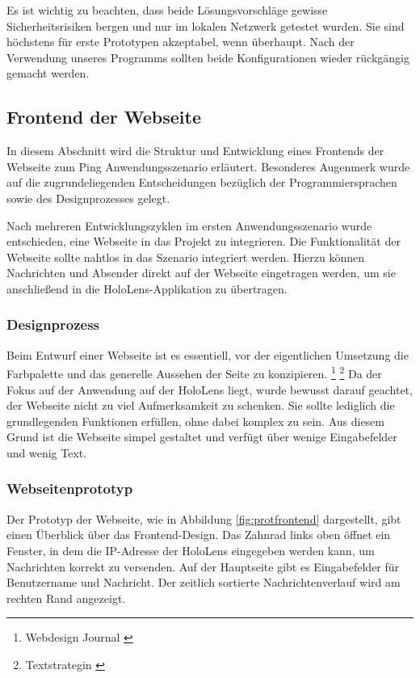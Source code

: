\begin{itemize}
Es ist wichtig zu beachten, dass beide Lösungsvorschläge gewisse Sicherheitsrisiken bergen und nur im lokalen Netzwerk getestet wurden. Sie sind höchstens für erste Prototypen akzeptabel, wenn überhaupt. Nach der Verwendung unseres Programms sollten beide Konfigurationen wieder rückgängig gemacht werden.

\subsection{\label{sec:FrontendWebseite}Frontend der Webseite}
In diesem Abschnitt wird die Struktur und Entwicklung eines Frontends der Webseite zum Ping Anwendungsszenario erläutert. Besonderes Augenmerk wurde auf die zugrundeliegenden Entscheidungen bezüglich der Programmiersprachen sowie des Designprozesses gelegt.

Nach mehreren Entwicklungszyklen im ersten Anwendungsszenario wurde entschieden, eine Webseite in das Projekt zu integrieren. Die Funktionalität der Webseite sollte nahtlos in das Szenario integriert werden. Hierzu können Nachrichten und Absender direkt auf der Webseite eingetragen werden, um sie anschließend in die HoloLens-Applikation zu übertragen.

\subsubsection{Designprozess}
Beim Entwurf einer Webseite ist es essentiell, vor der eigentlichen Umsetzung die Farbpalette und das generelle Aussehen der Seite zu konzipieren. \footnote{Webdesign Journal \cite{Website Konzept}} \footnote{Textstrategin \cite{Aufbau einer Website Inhalte und Struktur richtig Planen und Erstellen}} Da der Fokus auf der Anwendung auf der HoloLens liegt, wurde bewusst darauf geachtet, der Webseite nicht zu viel Aufmerksamkeit zu schenken. Sie sollte lediglich die grundlegenden Funktionen erfüllen, ohne dabei komplex zu sein. Aus diesem Grund ist die Webseite simpel gestaltet und verfügt über wenige Eingabefelder und wenig Text.

\subsubsection*{Webseitenprototyp}
Der Prototyp der Webseite, wie in Abbildung \ref{fig:protfrontend} dargestellt, gibt einen Überblick über das Frontend-Design. Das Zahnrad links oben öffnet ein Fenster, in dem die IP-Adresse der HoloLens eingegeben werden kann, um Nachrichten korrekt zu versenden. Auf der Hauptseite gibt es Eingabefelder für Benutzername und Nachricht. Der zeitlich sortierte Nachrichtenverlauf wird am rechten Rand angezeigt.


\end{itemize}
